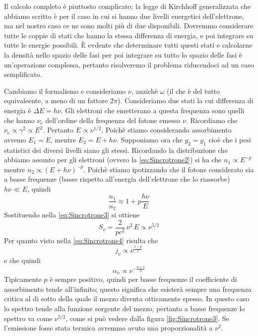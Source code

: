 Il calcolo completo è piuttosto complicato; la legge di Kirchhoff generalizzata che abbiamo scritto è per il caso in cui si hanno due livelli energetici dell'elettrone, ma nel nostro caso ce ne sono molti più di due disponibili. Dovremmo considerare tutte le coppie di stati che hanno la stessa differenza di energia, e poi integrare su tutte le energie possibili. È evdente che determinare tutti questi stati e calcolarne la densità nello spazio delle fasi per poi integrare su tutto lo spazio delle fasi è un'operazione complessa, pertanto risolveremo il problema riducendoci ad un caso semplificato. 

Cambiamo il formalismo e consideriamo $\nu$, anzichè $\omega$ (il che è del tutto equivaleente, a meno di un fattore $2\pi$). Consideriamo due stati la cui differenza di energia è $\Delta E = h \nu$. Gli elettroni che emetterano a questa frequenza sono quelli che hanno $\nu_\mathrm{c}$ dell'ordine della frequenza del fotone emesso $\nu$. Ricordiamo che $\nu_\mathrm{c}\propto \gamma^2 \propto E^2$. Pertanto $E\propto\nu^{1/2}$. Poichè stiamo considerando assorbimento avremo $E_1=E$, mentre $E_2=E+h\nu$. Supponiamo ora che $g_2 = g_1$ cioè che i pesi statistici dei diversi livelli siano gli stessi. Ricordando la distribuzione che abbiamo assunto per gli elettroni (ovvero la \ref{eq:Sincrotrone2}) si ha che $n_1\propto E^{-p}$ mentre $n_2\propto (E+h\nu)^{-p}$. Poichè stiamo ipotizzando che il fotone considerato sia a basse frequenze (basse rispetto all'energia dell'elettrone che lo riassorbe) $h\nu \ll E$, quindi 
\begin{equation}
\dfrac{n_1}{n_2} \approx 1+ p\dfrac{h\nu}{E}
\end{equation}
Sostituendo nella \ref{eq:Sincrotrone3} si ottiene
\begin{equation}
S_\nu = \dfrac{2}{pc^2}\, \nu^2 \, E \propto \nu^{5/2}
\end{equation}
Per quanto visto nella \ref{eq:Sincrotrone4} risulta che 
\begin{equation}
j_\nu \propto \nu^\frac{1-p}{2}
\end{equation}
e che quindi 
\begin{equation}
\alpha_\nu \propto \nu^{-\frac{p+4}{2}}
\end{equation}
Tipicamente $p$ è sempre positivo, quindi per basse frequenze il coefficiente di assorbimento tende all'infinito; questo significa che esisterà sempre una frequenza critica al di sotto della quale il mezzo diventa otticamente spesso. In questo caso lo spettro tende alla funzione sorgente del mezzo, pertanto a basse frequenze lo spettro va come $\nu^{5/2}$, come si può vedere dalla figura \ref{fig:Sincrotrone3}. Se l'emissione fosse stata termica avremmo avuto una proporzionalità a $\nu^2$.
